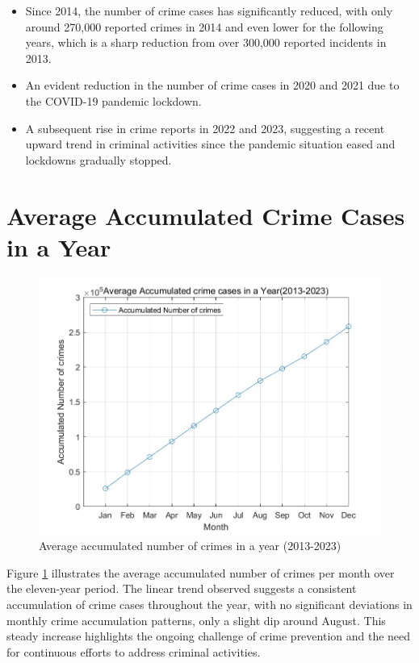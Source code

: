 \documentclass{article}
\begin{document}
   \begin{itemize}
    \item Since 2014, the number of crime cases has significantly reduced, with only around 270,000 reported crimes in 2014 and even lower for the following years, which is a sharp reduction from over 300,000 reported incidents in 2013.
    \item An evident reduction in the number of crime cases in 2020 and 2021 due to the COVID-19 pandemic lockdown.
    \item A subsequent rise in crime reports in 2022 and 2023, suggesting a recent upward trend in criminal activities since the pandemic situation eased and lockdowns gradually stopped.
\end{itemize}
\FloatBarrier

\section{Average Accumulated Crime Cases in a Year}


\begin{figure}[h!]
    \centering
    \includegraphics[width=0.8\linewidth]{Accumulated_crimeNumber_line.jpg}
    \caption{Average accumulated number of crimes in a year (2013-2023)}
    \label{fig:accumulated_crimes}
\end{figure}

Figure \ref{fig:accumulated_crimes} illustrates the average accumulated number of crimes per month over the eleven-year period. The linear trend observed suggests a consistent accumulation of crime cases throughout the year, with no significant deviations in monthly crime accumulation patterns, only a slight dip around August. This steady increase highlights the ongoing challenge of crime prevention and the need for continuous efforts to address criminal activities.
\FloatBarrier
\end{document}
